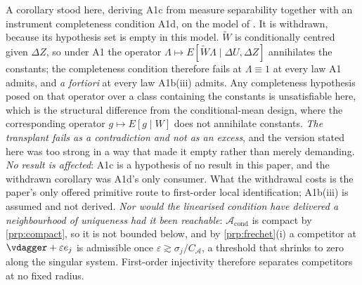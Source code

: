 \begin{remark}\label{rem:a1cwithdrawn}
A corollary stood here, deriving A1c from measure separability together with an instrument
completeness condition A1d, on the model of \citet[Prop.~2.2]{feve2014}. It is withdrawn,
because its hypothesis set is empty in this model. $\widetilde W$ is conditionally centred given
$\Delta Z$, so under A1 the operator $\Lambda\mapsto E[\widetilde W\Lambda\mid\Delta U,\Delta Z]$
annihilates the constants; the completeness condition therefore fails at $\Lambda\equiv1$ at every
law A1 admits, and \emph{a fortiori} at every law A1b(iii) admits. Any completeness hypothesis posed
on that operator over a class containing the constants is unsatisfiable here, which is the structural
difference from the conditional-mean design, where the corresponding operator $g\mapsto E[g\mid W]$
does not annihilate constants. \emph{The transplant fails as a contradiction and not as an excess},
and the version stated here was too strong in a way that made it empty rather than merely demanding.
\emph{No result is affected}: A1c is a hypothesis of no result in this paper, and the withdrawn
corollary was A1d's only consumer. What the withdrawal costs is the paper's only offered primitive
route to first-order local identification; A1b(iii) is assumed and not derived. \emph{Nor would the
linearised condition have delivered a neighbourhood of uniqueness had it been reachable}:
$\mathcal A_{\mathrm{cond}}$ is compact by \cref{prp:compact}, so it is not bounded below, and by
\cref{prp:frechet}\textup{(i)} a competitor at $\vdagger+\varepsilon e_j$ is admissible once
$\varepsilon\gtrsim\sigma_j/C_{\mathcal A}$, a threshold that shrinks to zero along the singular
system. First-order injectivity therefore separates competitors at no fixed radius.
\end{remark}

